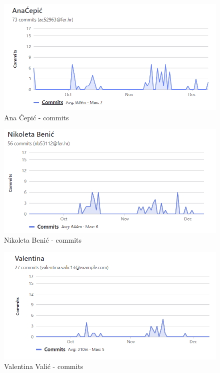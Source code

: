 		\begin{figure}[H]
				\includegraphics[scale=1]{slike/commits_ana_cepic.png} %
				
				\centering
				\caption{Ana Ćepić - commits}
				\label{fig:Ana Ćepić commits}
				\end{figure}
	
		\begin{figure}[H]
				\includegraphics[scale=1]{slike/commits_nikoleta_benic.png} %
				
				\centering
				\caption{Nikoleta Benić - commits}
				\label{fig:Nikoleta Benić commits}
				\end{figure}
	
		\begin{figure}[H]
				\includegraphics[scale=1]{slike/commits_valentina_valic.png} %
				
				\centering
				\caption{Valentina Valić - commits}
				\label{fig:Valentina Valić commits}
				\end{figure}
	
